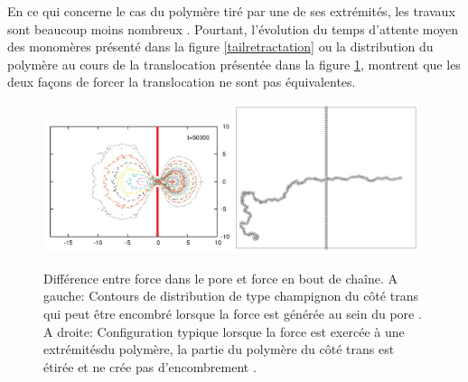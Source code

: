 En ce qui concerne le cas du polymère tiré par une de ses extrémités, les travaux sont beaucoup moins nombreux \cite{Kantor2004,Grosberg2006,Huopaniemi2007,Panja2008}. Pourtant, l'évolution du temps d'attente moyen des monomères présenté dans la figure \ref{tailretractation} ou la distribution du polymère au cours de la translocation présentée dans la figure \ref{translocshape}, montrent que les deux façons de forcer la translocation ne sont pas équivalentes.


\begin{figure}[H]
\begin{center}
\includegraphics[width=0.49\textwidth]{transshapeintopore.jpg}\includegraphics[width=0.49\textwidth]{shapetractiontransloc.jpg} 

\caption[Force dans le pore et force en bout de chaîne]{Différence entre force dans le pore et force en bout de chaîne. A gauche: Contours de distribution de type champignon du côté trans qui peut être encombré lorsque la force est générée au sein du pore \cite{Dubbeldam2012}. A droite: Configuration typique lorsque la force est exercée à une extrémitésdu polymère, la partie du polymère du côté trans est étirée et ne crée pas d'encombrement \cite{Huopaniemi2007}.}
\label{translocshape}
\end{center}
\end{figure}




